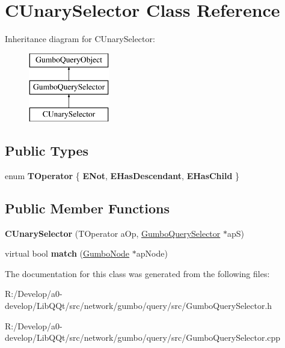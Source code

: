 \hypertarget{class_c_unary_selector}{}\section{C\+Unary\+Selector Class Reference}
\label{class_c_unary_selector}
Inheritance diagram for C\+Unary\+Selector\+:\begin{figure}[H]
\begin{center}
\leavevmode
\includegraphics[height=3.000000cm]{class_c_unary_selector}
\end{center}
\end{figure}
\subsection*{Public Types}
\begin{DoxyCompactItemize}
\item 
\mbox{\label{class_c_unary_selector_a59104efdbccb25c12bbfb5aaa2d0a8f1}} 
enum {\bfseries T\+Operator} \{ {\bfseries E\+Not}, 
{\bfseries E\+Has\+Descendant}, 
{\bfseries E\+Has\+Child}
 \}
\end{DoxyCompactItemize}
\subsection*{Public Member Functions}
\begin{DoxyCompactItemize}
\item 
\mbox{\label{class_c_unary_selector_a2b6b3ca8969ff8bebc2469975c2769d9}} 
{\bfseries C\+Unary\+Selector} (T\+Operator a\+Op, \mbox{\hyperlink{class_gumbo_query_selector}{Gumbo\+Query\+Selector}} $\ast$apS)
\item 
\mbox{\label{class_c_unary_selector_a31ca244589b23ac35b25f96148864544}} 
virtual bool {\bfseries match} (\mbox{\hyperlink{gumbo_8h_a5f67d8397fda8fb7c90cc27f14ac4e7d}{Gumbo\+Node}} $\ast$ap\+Node)
\end{DoxyCompactItemize}


The documentation for this class was generated from the following files\+:\begin{DoxyCompactItemize}
\item 
R\+:/\+Develop/a0-\/develop/\+Lib\+Q\+Qt/src/network/gumbo/query/src/Gumbo\+Query\+Selector.\+h\item 
R\+:/\+Develop/a0-\/develop/\+Lib\+Q\+Qt/src/network/gumbo/query/src/Gumbo\+Query\+Selector.\+cpp\end{DoxyCompactItemize}
